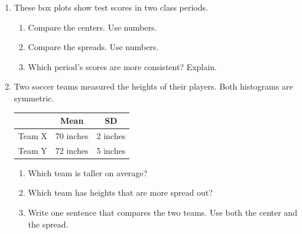 \documentclass[11pt]{article}
\begin{document}
\begin{enumerate}
\begin{enumerate}[itemsep=5em]
  \work{1em}
  \item Compare the spreads.

  \item Does either class have an outlier? Explain.

\end{enumerate}

\newpage
\item These box plots show test scores in two class periods.
\begin{center}\end{center}
\begin{enumerate}[itemsep=\ifkey 2em\else 4em\fi]
  \item Compare the centers. Use numbers.

  \item Compare the spreads. Use numbers.

  \item Which period's scores are more consistent? Explain.

\end{enumerate}
\work{2em}

\item Two soccer teams measured the heights of their players. Both histograms are symmetric.

\begin{center}
\renewcommand{\arraystretch}{1.3}
\begin{tabular}{|l|c|c|}\hline
 & Mean & SD \\ \hline
Team X & 70 inches & 2 inches \\ \hline
Team Y & 72 inches & 5 inches \\ \hline
\end{tabular}
\end{center}
\begin{enumerate}[itemsep=2em]
  \item Which team is taller on average? 
  \item Which team has heights that are more spread out? 
  \item Write one sentence that compares the two teams. Use both the center and the spread.

\end{enumerate}

\end{enumerate}
\end{document}
